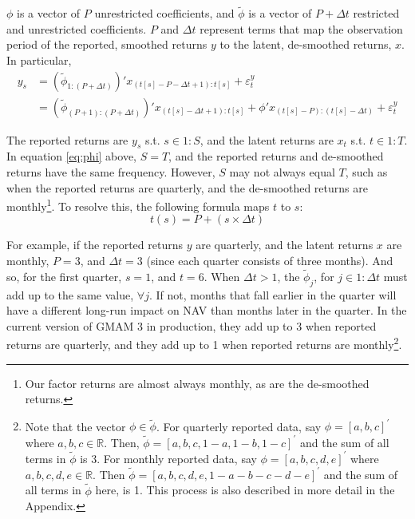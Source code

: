 \documentclass[11pt]{article}
\begin{document}
$\phi$ is a vector of $P$ unrestricted coefficients, and $\tilde{\phi}$ is a vector of $P + \Delta t$ restricted and unrestricted coefficients. $P$ and $\Delta t$ represent terms that map the observation period of the reported, smoothed returns $y$ to the latent, de-smoothed returns, $x$. In particular,
\begin{align}
	y_{s} 	&= \left(\tilde{\phi}_{1:\left(P+\Delta t\right)}\right)'x_{(t[s]-P-\Delta t+1):t[s]}+\varepsilon_{t}^{y}	\\
			&= \left(\tilde{\phi}_{\left(P+1\right):\left(P+\Delta t\right)}\right)'x_{\left(t[s]-\Delta t+1\right):t[s]}+\phi'x_{(t[s]-P):\left(t[s]-\Delta t\right)}+\varepsilon_{t}^{y}
\end{align}

The reported returns are $y_s$ s.t. $s \in 1:S$, and the latent returns are $x_t$ s.t. $t \in 1:T$. In equation \eqref{eq:phi} above, $S = T$, and the reported returns and de-smoothed returns have the same frequency. However, $S$ may not always equal $T$, such as when the reported returns are quarterly, and the de-smoothed returns are monthly\footnote{Our factor returns are almost always monthly, as are the de-smoothed returns.}. To resolve this, the following formula maps $t$ to $s$:
\begin{equation}
	t(s) = P + (s \times \Delta t)
\end{equation}

For example, if the reported returns $y$ are quarterly, and the latent returns $x$ are monthly, $P=3$, and $\Delta t = 3$ (since each quarter consists of three months). And so, for the first quarter, $s = 1$, and $t = 6$. When $\Delta t > 1$, the $\tilde{\phi}_j$, for $j \in 1:\Delta t$ must add up to the same value, $\forall j$. If not, months that fall earlier in the quarter will have a different long-run impact on NAV than months later in the quarter. In the current version of GMAM 3 in production, they add up to 3 when reported returns are quarterly, and they add up to 1 when reported returns are monthly\footnote{Note that the vector $\phi \in \tilde{\phi}$. For quarterly reported data, say $\phi = [a, b, c]^\prime$ where $a, b, c \in \mathbb{R}$. Then, $\tilde{\phi} = [a, b, c, 1-a, 1-b, 1-c]^\prime$ and the sum of all terms in $\tilde{\phi}$ is 3. For monthly reported data, say $\phi = [a, b, c, d, e]^\prime$ where $a, b, c, d,e \in \mathbb{R}$. Then $\tilde{\phi} = [a, b, c, d, e, 1-a-b-c-d-e]^\prime$ and the sum of all terms in $\tilde{\phi}$ here, is 1. This process is also described in more detail in the Appendix.}.  \\
\end{document}
